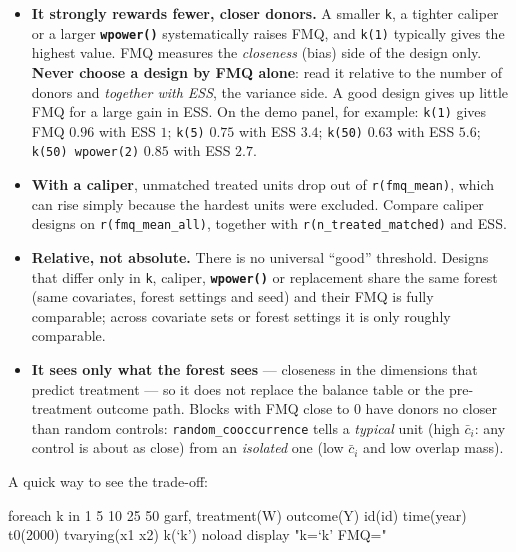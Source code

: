 \documentclass[11pt,a4paper]{article}
\newcommand{\opt}[1]{\texttt{\textbf{#1}}}
\newcommand{\code}[1]{\texttt{#1}}
\begin{document}
\begin{itemize}[leftmargin=1.5em,itemsep=1pt,topsep=2pt]
\item \textbf{It strongly rewards fewer, closer donors.} A smaller \code{k}, a tighter caliper or a
larger \opt{wpower()} systematically raises FMQ, and \code{k(1)} typically gives the highest value. FMQ measures the
\emph{closeness} (bias) side of the design only. \textbf{Never choose a design by FMQ alone}: read
it relative to the number of donors and \emph{together with ESS}, the variance side. A good design
gives up little FMQ for a large gain in ESS. On the demo panel, for example: \code{k(1)} gives
FMQ $0.96$ with ESS $1$; \code{k(5)} $0.75$ with ESS $3.4$; \code{k(50)} $0.63$ with ESS $5.6$;
\code{k(50) wpower(2)} $0.85$ with ESS $2.7$.
\item \textbf{With a caliper}, unmatched treated units drop out of \code{r(fmq\_mean)}, which can
rise simply because the hardest units were excluded. Compare caliper designs on
\code{r(fmq\_mean\_all)}, together with \code{r(n\_treated\_matched)} and ESS.
\item \textbf{Relative, not absolute.} There is no universal ``good'' threshold. Designs that differ
only in \code{k}, caliper, \opt{wpower()} or replacement share the same forest (same covariates,
forest settings and seed) and their FMQ is fully comparable; across covariate sets or forest
settings it is only roughly comparable.
\item \textbf{It sees only what the forest sees} --- closeness in the dimensions that predict
treatment --- so it does not replace the balance table or the pre-treatment outcome path. Blocks
with FMQ close to 0 have donors no closer than random controls: \code{random\_cooccurrence} tells a
\emph{typical} unit (high $\bar c_i$: any control is about as close) from an \emph{isolated} one
(low $\bar c_i$ and low overlap mass).
\end{itemize}
A quick way to see the trade-off:
\begin{stata}
foreach k in 1 5 10 25 50 {
    garf, treatment(W) outcome(Y) id(id) time(year) t0(2000) tvarying(x1 x2) k(`k') noload
    display "k=`k'   FMQ=" %
}
\end{stata}
\end{document}
